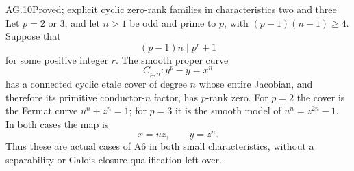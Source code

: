 \begin{claim}{AG.10}{Proved; explicit cyclic zero-rank families in characteristics two and three}
Let $p=2$ or $3$, and let $n>1$ be odd and prime to $p$, with
$(p-1)(n-1)\ge4$. Suppose that
\[
                    (p-1)n\mid p^r+1
\]
for some positive integer $r$. The smooth proper curve
\[
                         C_{p,n}:y^p-y=x^n
\]
has a connected cyclic etale cover of degree $n$ whose entire
Jacobian, and therefore its primitive conductor-$n$ factor,
has $p$-rank zero. For $p=2$ the cover is the Fermat curve
$u^n+z^n=1$; for $p=3$ it is the smooth model of
$u^n=z^{2n}-1$. In both cases the map is
\[
                         x=uz,\qquad y=z^n.
\]
Thus these are actual cases of A6 in both small characteristics,
without a separability or Galois-closure qualification left over.
\end{claim}
